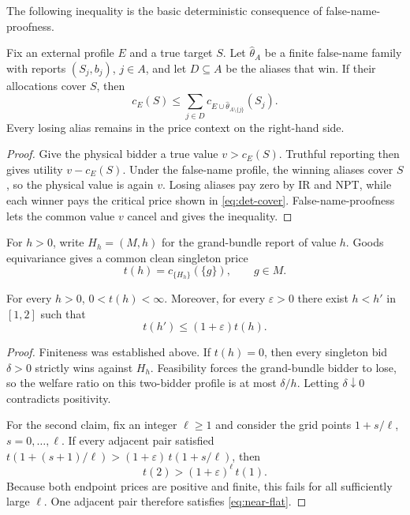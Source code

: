 \documentclass[format=acmsmall, review=false]{acmart}
\newcommand{\eps}{\varepsilon}
\begin{document}
The following inequality is the basic deterministic consequence of
false-name-proofness.

\begin{lemma}
\label{lem:det-cover}
Fix an external profile $E$ and a true target $S$.  Let $\hat\theta_A$ be a
finite false-name family with reports $(S_j,b_j)$, $j\in A$, and let
$D\subseteq A$ be the aliases that win.  If their allocations cover $S$, then
\begin{equation}
  c_E(S)
  \le
  \sum_{j\in D}
  c_{E\cup\hat\theta_{A\setminus\{j\}}}(S_j).
  \label{eq:det-cover}
\end{equation}
Every losing alias remains in the price context on the right-hand side.
\end{lemma}

\begin{proof}
Give the physical bidder a true value $v>c_E(S)$.  Truthful reporting
then gives utility $v-c_E(S)$.  Under the false-name profile, the winning
aliases cover $S$, so the physical value is again $v$.  Losing aliases
pay zero by IR and NPT, while each winner pays the critical price shown
in \eqref{eq:det-cover}.  False-name-proofness lets the common value $v$
cancel and gives the inequality.
\end{proof}

For $h>0$, write $H_h=(M,h)$ for the grand-bundle report of value $h$.
Goods equivariance gives a common clean singleton price
\[
  t(h)=c_{\{H_h\}}(\{g\}),
  \qquad g\in M.
\]

\begin{lemma}
\label{lem:no-iig-flat}
For every $h>0$, $0<t(h)<\infty$.  Moreover, for every $\eps>0$ there exist
$h<h'$ in $[1,2]$ such that
\begin{equation}
  t(h')\le(1+\eps)t(h).
  \label{eq:near-flat}
\end{equation}
\end{lemma}

\begin{proof}
Finiteness was established above.  If $t(h)=0$, then every singleton bid
$\delta>0$ strictly wins against $H_h$.  Feasibility forces the grand-bundle
bidder to lose, so the welfare ratio on this two-bidder profile is at most
$\delta/h$.  Letting $\delta\downarrow0$ contradicts positivity.

For the second claim, fix an integer $\ell\ge1$ and consider the grid
points $1+s/\ell$, $s=0,\ldots,\ell$.  If every adjacent pair satisfied
$t(1+(s+1)/\ell)>(1+\eps)\,t(1+s/\ell)$, then
\[
  t(2)>(1+\eps)^\ell\, t(1).
\]
Because both endpoint prices are positive and finite, this fails for all
sufficiently large $\ell$.  One adjacent pair therefore satisfies
\eqref{eq:near-flat}.
\end{proof}
\end{document}
